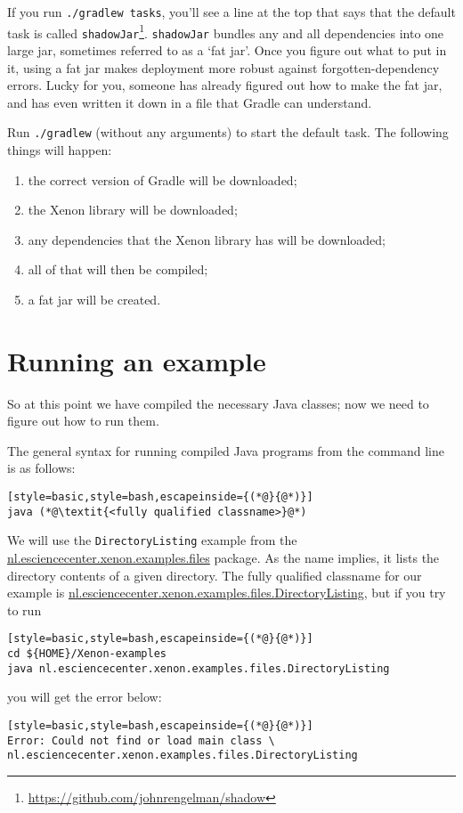 If you run \texttt{./gradlew tasks}, you'll see a line at the top that says that the default task is called \texttt{shadowJar}\footnote{\url{https://github.com/johnrengelman/shadow}}. \texttt{shadowJar} bundles any and all dependencies into one large jar, sometimes referred to as a `fat jar'. Once you figure out what to put in it, using a fat jar makes deployment more robust against forgotten-dependency errors. Lucky for you, someone has already figured out how to make the fat jar, and has even written it down in a file that Gradle can understand.

Run \texttt{./gradlew} (without any arguments) to start the default task. The following things will happen:
\begin{enumerate}
\item{the correct version of Gradle will be downloaded;}
\item{the Xenon library will be downloaded;}
\item{any dependencies that the Xenon library has will be downloaded;}
\item{all of that will then be compiled;}
\item{a fat jar will be created.}
\end{enumerate}



\section{Running an example}

So at this point we have compiled the necessary Java classes; now we need to figure out how to run them.

The general syntax for running compiled Java programs from the command line is as follows:
\begin{lstlisting}[style=basic,style=bash,escapeinside={(*@}{@*)}]
java (*@\textit{<fully qualified classname>}@*)
\end{lstlisting}
We will use the \texttt{DirectoryListing} example from the \url{nl.esciencecenter.xenon.examples.files} package. As the name implies, it lists the directory contents of a given directory. The fully qualified classname for our example is \url{nl.esciencecenter.xenon.examples.files.DirectoryListing}, but if you try to run
\begin{lstlisting}[style=basic,style=bash,escapeinside={(*@}{@*)}]
cd ${HOME}/Xenon-examples
java nl.esciencecenter.xenon.examples.files.DirectoryListing
\end{lstlisting} %
you will get the error below:
\begin{lstlisting}[style=basic,style=bash,escapeinside={(*@}{@*)}]
Error: Could not find or load main class \
nl.esciencecenter.xenon.examples.files.DirectoryListing
\end{lstlisting}


